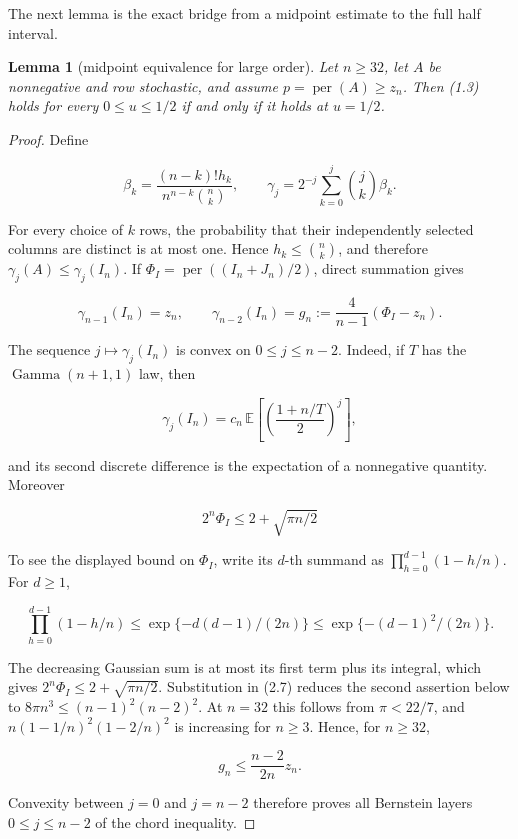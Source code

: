 \documentclass[11pt]{article}
\newtheorem{lemma}[theorem]{Lemma}
\begin{document}
The next lemma is the exact bridge from a midpoint estimate to the full half
interval.

\Needspace{0.18\textheight}
\begin{lemma}[midpoint equivalence for large order]

Let $n\ge32$, let $A$ be nonnegative and row stochastic, and assume
$p=\operatorname{per}(A)\ge z_n$.  Then (1.3) holds for every
$0\le u\le1/2$ if and only if it holds at $u=1/2$.

\end{lemma}

\begin{proof}


Define

\[
\beta_k=\frac{(n-k)!h_k}{n^{n-k}\binom nk},\qquad
\gamma_j=2^{-j}\sum_{k=0}^j\binom jk\beta_k. \tag{2.6}
\]

For every choice of $k$ rows, the probability that their independently
selected columns are distinct is at most one.  Hence
$h_k\le\binom nk$, and therefore
$\gamma_j(A)\le\gamma_j(I_n)$.  If
$\Phi_I=\operatorname{per}((I_n+J_n)/2)$, direct summation gives

\[
\gamma_{n-1}(I_n)=z_n,\qquad
\gamma_{n-2}(I_n)=g_n:=\frac4{n-1}(\Phi_I-z_n). \tag{2.7}
\]

The sequence $j\mapsto\gamma_j(I_n)$ is convex on
$0\le j\le n-2$.  Indeed, if $T$ has the
$\operatorname{Gamma}(n+1,1)$ law, then

\[
\gamma_j(I_n)=c_n\,\mathbb E\left[\left(\frac{1+n/T}{2}\right)^j\right],
\]

and its second discrete difference is the expectation of a nonnegative
quantity.  Moreover

\[
2^n\Phi_I\le2+\sqrt{\pi n/2}
\]

To see the displayed bound on $\Phi_I$, write its $d$-th summand as
$\prod_{h=0}^{d-1}(1-h/n)$.  For $d\ge1$,

\[
 \prod_{h=0}^{d-1}(1-h/n)
 \le \exp\{-d(d-1)/(2n)\}
 \le \exp\{-(d-1)^2/(2n)\}.
\]

The decreasing Gaussian sum is at most its first term plus its integral,
which gives $2^n\Phi_I\le2+\sqrt{\pi n/2}$.  Substitution in (2.7)
reduces the second assertion below to
$8\pi n^3\le(n-1)^2(n-2)^2$.  At $n=32$ this follows from
$\pi<22/7$, and
$n(1-1/n)^2(1-2/n)^2$ is increasing for $n\ge3$.  Hence, for
$n\ge32$,

\[
 g_n\le\frac{n-2}{2n}z_n. \tag{2.8}
\]

Convexity between $j=0$ and $j=n-2$ therefore proves all Bernstein
layers $0\le j\le n-2$ of the chord inequality.


\end{proof}
\end{document}
